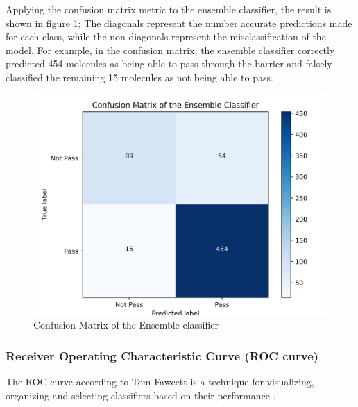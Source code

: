 \documentclass[a4paper,12pt]{report}
\begin{document}
		Applying the confusion matrix metric to the ensemble classifier, the result is shown in figure \ref{fig:confusion_matrix}; The diagonals represent the number accurate predictions made for each class, while the non-diagonals represent the misclassification of the model. For example, in the confusion matrix, the ensemble classifier correctly predicted 454 molecules as being able to pass through the barrier and falsely classified the remaining 15 molecules as not being able to pass.
			\begin{figure}[H]
				\centering
				\includegraphics[width=\textwidth,scale=1]{images/confusion_matrix}
				\caption{Confusion Matrix of the Ensemble classifier}
				\label{fig:confusion_matrix}
			\end{figure}
			
			\subsubsection{Receiver Operating Characteristic Curve (ROC curve)}
			The ROC curve according to Tom Fawcett is a technique for visualizing, organizing and selecting classifiers based on their performance \cite{TFawcett2005}.
			
\end{document}
